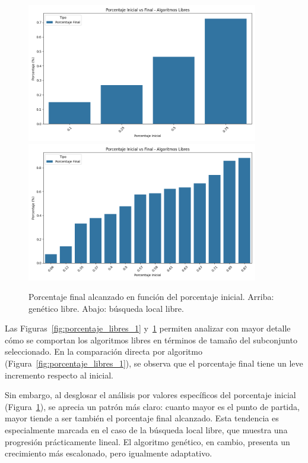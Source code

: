 \begin{figure}[H]
    \centering
    \includegraphics[width=0.9\textwidth]{imagenes/evaluaciones/libres/porcentaje-inicial-vs-final-por-pi_gev_v2.png}
    \vspace{1em}
    \includegraphics[width=0.9\textwidth]{imagenes/evaluaciones/libres/porcentaje-inicial-vs-final-por-pi_bl.png}
    \caption{Porcentaje final alcanzado en función del porcentaje inicial.
        Arriba: genético libre.
        Abajo: búsqueda local libre.
    }
    \label{fig:porcentaje_libres_2}
\end{figure}

Las Figuras~\ref{fig:porcentaje_libres_1} y~\ref{fig:porcentaje_libres_2} permiten analizar con mayor detalle cómo se comportan 
los algoritmos libres en términos de tamaño del subconjunto seleccionado.
En la comparación directa por algoritmo (Figura~\ref{fig:porcentaje_libres_1}), se observa que el porcentaje final tiene un leve incremento respecto al inicial.

Sin embargo, al desglosar el análisis por valores específicos del porcentaje inicial (Figura~\ref{fig:porcentaje_libres_2}), 
se aprecia un patrón más claro: cuanto mayor es el punto de partida, mayor tiende a ser también el porcentaje final alcanzado.
Esta tendencia es especialmente marcada en el caso de la búsqueda local libre, que muestra una progresión prácticamente lineal.
El algoritmo genético, en cambio, presenta un crecimiento más escalonado, pero igualmente adaptativo.

